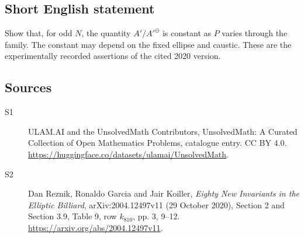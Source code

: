 \documentclass[11pt]{article}
\begin{document}
\subsection{Short English statement}
Show that, for odd $N$, the quantity $A'/{A'}^\ominus$ is constant as $P$ varies through the family. The constant may depend on the fixed ellipse and caustic. These are the experimentally recorded assertions of the cited 2020 version.
\subsection{Sources}
\begin{description}
\item[\hypertarget{source:statement:1}{S1}] ULAM.AI and the UnsolvedMath Contributors, UnsolvedMath: A Curated Collection of Open Mathematics Problems, catalogue entry. CC BY 4.0. \url{https://huggingface.co/datasets/ulamai/UnsolvedMath}.
\item[\hypertarget{source:statement:2}{S2}] Dan Reznik, Ronaldo Garcia and Jair Koiller, \emph{Eighty New Invariants in the Elliptic Billiard}, arXiv:2004.12497v11 (29 October 2020), Section 2 and Section 3.9, Table 9, row $k_{810}$, pp. 3, 9--12. \url{https://arxiv.org/abs/2004.12497v11}.
\end{description}
\label{end:statement}
\end{document}
